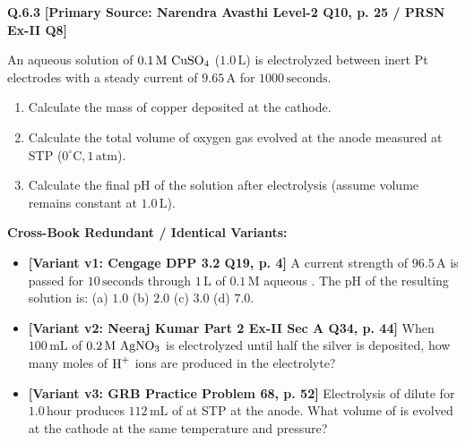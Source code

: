 \begin{problembox}
\textbf{Q.6.3} \hfill \textbf{[Primary Source: Narendra Avasthi Level-2 Q10, p. 25 / PRSN Ex-II Q8]}
\label{q:qb-c6-03}

An aqueous solution of $0.1\,\text{M } \ce{CuSO4}$ ($1.0\,\text{L}$) is electrolyzed between inert Pt electrodes with a steady current of $9.65\,\text{A}$ for $1000\,\text{seconds}$.
\begin{enumerate}[label=(\alph*)]
    \item Calculate the mass of copper deposited at the cathode.
    \item Calculate the total volume of oxygen gas evolved at the anode measured at STP ($0^\circ\text{C}, 1\,\text{atm}$).
    \item Calculate the final $\text{pH}$ of the solution after electrolysis (assume volume remains constant at $1.0\,\text{L}$).
\end{enumerate}

\tcbline
\textbf{\color{accentamber}Cross-Book Redundant / Identical Variants:}
\begin{itemize}[leftmargin=*,itemsep=2pt]
    \item \textbf{[Variant v1: Cengage DPP 3.2 Q19, p. 4]} A current strength of $96.5\,\text{A}$ is passed for $10\,\text{seconds}$ through $1\,\text{L}$ of $0.1\,\text{M}$ aqueous . The pH of the resulting solution is: (a) $1.0$ (b) $2.0$ (c) $3.0$ (d) $7.0$.
    \item \textbf{[Variant v2: Neeraj Kumar Part 2 Ex-II Sec A Q34, p. 44]} When $100\,\text{mL}$ of $0.2\,\text{M } \ce{AgNO3}$ is electrolyzed until half the silver is deposited, how many moles of $\ce{H+}$ ions are produced in the electrolyte?
    \item \textbf{[Variant v3: GRB Practice Problem 68, p. 52]} Electrolysis of dilute  for $1.0\,\text{hour}$ produces $112\,\text{mL}$ of  at STP at the anode. What volume of  is evolved at the cathode at the same temperature and pressure?
\end{itemize}
\end{problembox}
